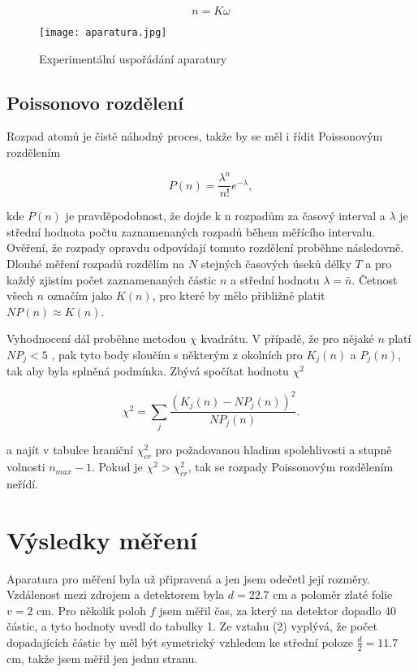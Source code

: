 \documentclass[a4paper,11pt]{article}
\begin{document}
\begin{equation}
n = K \omega
\end{equation}

\begin{figure}[htpb]
    \centering
    \texttt{[image: aparatura.jpg]}
    \caption{Experimentální uspořádání aparatury}
\end{figure}

\subsection{Poissonovo rozdělení}

Rozpad atomů je čistě náhodný proces, takže by se měl i řídit Poissonovým rozdělením  

\begin{equation}
P(n) = \frac{\lambda^{n}}{n!}e^{-\lambda},
\end{equation}

\noindent
kde $ P(n) $  je pravděpodobnost, že dojde k n rozpadům za časový interval a $ \lambda $  je střední hodnota počtu zaznamenaných rozpadů během měřícího intervalu. Ověření, že rozpady opravdu odpovídají tomuto rozdělení proběhne následovně. Dlouhé měření rozpadů rozdělím na $ N $  stejných časových úseků délky $ T $ a pro každý zjistím počet zaznamenaných částic $ n $ a střední hodnotu $ \lambda = \bar{n}  $. Četnost všech $ n $ označím jako $ K ( n ) $, pro které by mělo přibližně platit $ N P(n) \approx K(n) $.

Vyhodnocení dál proběhne metodou $ \chi $  kvadrátu. V případě, že pro nějaké $ n $  platí $ N P_{j} < 5 $ , pak tyto body sloučím s některým z okolních pro $ K_j(n) $ a $ P_j(n) $, tak aby byla splněná podmínka. Zbývá spočítat hodnotu $ \chi^2 $

\begin{equation}
\chi^2 = \sum_{j} \frac{\left( K_j(n) - N P_j(n) \right)^2 }{ N P_j(n)}.
\end{equation}

\noindent
a najít v tabulce hraniční $ \chi_{cr}^2 $ pro požadovanou hladinu spolehlivosti a stupně volnosti  $ n_{max}-1 $. Pokud je $ \chi^2 > \chi_{cr}^2 $, tak se rozpady Poissonovým rozdělením neřídí.
\newpage

\section{Výsledky měření}

Aparatura pro měření byla už připravená a jen jsem odečetl její rozměry. Vzdálenost mezi zdrojem a detektorem byla $ d = 22.7 $ cm a poloměr zlaté folie $ v = 2 $ cm. Pro několik poloh $ f $ jsem měřil čas, za který na detektor dopadlo 40 částic, a tyto hodnoty uvedl do tabulky 1. Ze vztahu (2) vyplývá, že počet dopadajících částic by měl být symetrický vzhledem ke střední poloze $ \frac{d}{2} = 11.7 $  cm, takže  jsem měřil jen jednu stranu.
\end{document}
